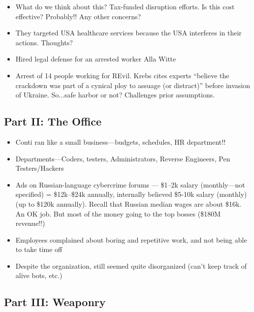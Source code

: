 \documentclass[11pt]{article}
\begin{document}
\begin{itemize}
\begin{itemize}
        \item What do we think about this? Tax-funded disruption efforts. Is this cost effective? Probably!! Any other concerns?
        \item They targeted USA healthcare services because the USA interferes in their actions. Thoughts?
        \item Hired legal defense for an arrested worker Alla Witte
        \item Arrest of 14 people working for REvil. Krebs cites experts ``believe the crackdown was part of a cynical ploy to assuage (or distract)'' before invasion of Ukraine. So...safe harbor or not? Challenges prior assumptions.
    \end{itemize}
\end{itemize}

\subsection{Part II: The Office}

\begin{itemize}
    \item Conti ran like a small business---budgets, schedules, HR department!!
    \item Departments---Coders, testers, Administrators, Reverse Engineers, Pen Testers/Hackers
    \item Ads on Russian-language cybercrime forums --- \$1--2k salary (monthly---not specified) = \$12k--\$24k annually, internally believed \$5-10k salary (monthly) (up to \$120k annually). Recall that Russian median wages are about \$16k. An OK job. But most of the money going to the top bosses (\$180M revenue!!)
    \item Employees complained about boring and repetitive work, and not being able to take time off
    \item Despite the organization, still seemed quite disorganized (can't keep track of alive bots, etc.)
\end{itemize}

\subsection{Part III: Weaponry}
\end{document}
